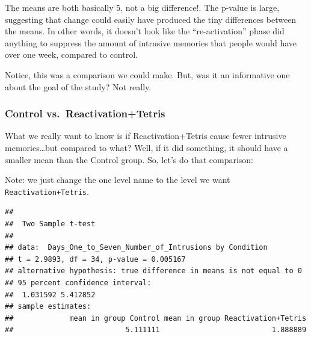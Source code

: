 \documentclass[]{book}
\newenvironment{Shaded}{\begin{snugshade}}{\end{snugshade}}
\newcommand{\KeywordTok}[1]{\textcolor[rgb]{0.13,0.29,0.53}{\textbf{#1}}}
\newcommand{\DataTypeTok}[1]{\textcolor[rgb]{0.13,0.29,0.53}{#1}}
\newcommand{\StringTok}[1]{\textcolor[rgb]{0.31,0.60,0.02}{#1}}
\newcommand{\OtherTok}[1]{\textcolor[rgb]{0.56,0.35,0.01}{#1}}
\newcommand{\OperatorTok}[1]{\textcolor[rgb]{0.81,0.36,0.00}{\textbf{#1}}}
\newcommand{\NormalTok}[1]{#1}
\begin{document}
The means are both basically 5, not a big difference!. The p-value is
large, suggesting that change could easily have produced the tiny
differences between the means. In other words, it doesn't look like the
``re-activation'' phase did anything to suppress the amount of intrusive
memories that people would have over one week, compared to control.

Notice, this was a comparison we could make. But, was it an informative
one about the goal of the study? Not really.

\subsubsection{Control
vs.~Reactivation+Tetris}\label{control-vs.reactivationtetris}

What we really want to know is if Reactivation+Tetris cause fewer
intrusive memories\ldots{}but compared to what? Well, if it did
something, it should have a smaller mean than the Control group. So,
let's do that comparison:

Note: we just change the one level name to the level we want
\texttt{Reactivation+Tetris}.

\begin{Shaded}
\end{Shaded}

\begin{verbatim}
## 
##  Two Sample t-test
## 
## data:  Days_One_to_Seven_Number_of_Intrusions by Condition
## t = 2.9893, df = 34, p-value = 0.005167
## alternative hypothesis: true difference in means is not equal to 0
## 95 percent confidence interval:
##  1.031592 5.412852
## sample estimates:
##             mean in group Control mean in group Reactivation+Tetris 
##                          5.111111                          1.888889
\end{verbatim}
\end{document}
